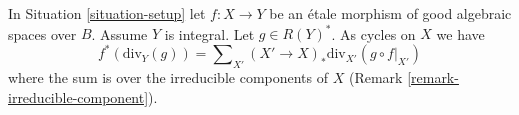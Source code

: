 %
\begin{lemma}
\label{lemma-etale-pullback-principal-divisor}
In Situation \ref{situation-setup} let $f : X \to Y$ be an \'etale
morphism of good algebraic spaces over $B$. Assume $Y$ is integral.
Let $g \in R(Y)^*$. As cycles on $X$ we have
$$
f^*(\text{div}_Y(g)) =
\sum\nolimits_{X'} (X' \to X)_*\text{div}_{X'}(g \circ f|_{X'})
$$
where the sum is over the irreducible components of $X$
(Remark \ref{remark-irreducible-component}).
\end{lemma}

